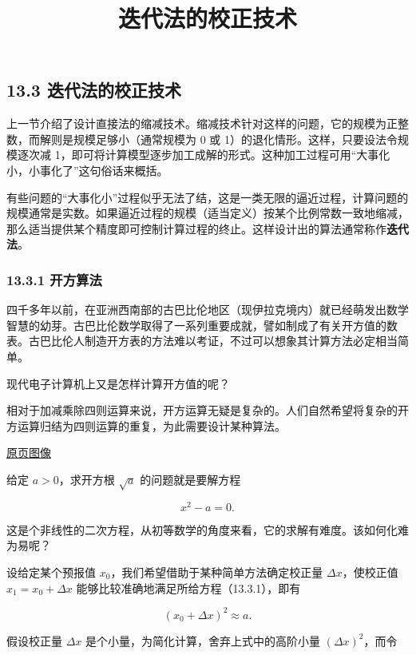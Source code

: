 \documentclass[
  10pt,
  fontset=fandol]{ctexart}
\title{迭代法的校正技术}
\author{}
\date{}
\begin{document}
\maketitle

\subsection{13.3 迭代法的校正技术}\label{ux8fedux4ee3ux6cd5ux7684ux6821ux6b63ux6280ux672f}

上一节介绍了设计直接法的缩减技术。缩减技术针对这样的问题，它的规模为正整数，而解则是规模足够小（通常规模为 0 或 1）的退化情形。这样，只要设法令规模逐次减 1，即可将计算模型逐步加工成解的形式。这种加工过程可用``大事化小，小事化了''这句俗话来概括。

有些问题的``大事化小''过程似乎无法了结，这是一类无限的逼近过程，计算问题的规模通常是实数。如果逼近过程的规模（适当定义）按某个比例常数一致地缩减，那么适当提供某个精度即可控制计算过程的终止。这样设计出的算法通常称作\textbf{迭代法}。

\subsubsection{13.3.1 开方算法}\label{ux5f00ux65b9ux7b97ux6cd5}

四千多年以前，在亚洲西南部的古巴比伦地区（现伊拉克境内）就已经萌发出数学智慧的幼芽。古巴比伦数学取得了一系列重要成就，譬如制成了有关开方值的数表。古巴比伦人制造开方表的方法难以考证，不过可以想象其计算方法必定相当简单。

现代电子计算机上又是怎样计算开方值的呢？

相对于加减乘除四则运算来说，开方运算无疑是复杂的。人们自然希望将复杂的开方运算归结为四则运算的重复，为此需要设计某种算法。

\href{../../source-images/pdf-312.jpeg}{原页图像}

给定 \(a>0\)，求开方根 \(\sqrt{a}\) 的问题就是要解方程

\[
x^2-a=0.
\tag{13.3.1}
\]

这是个非线性的二次方程，从初等数学的角度来看，它的求解有难度。该如何化难为易呢？

设给定某个预报值 \(x_0\)，我们希望借助于某种简单方法确定校正量 \(\Delta x\)，使校正值 \(x_1=x_0+\Delta x\) 能够比较准确地满足所给方程（13.3.1），即有

\[
(x_0+\Delta x)^2\approx a.
\]

假设校正量 \(\Delta x\) 是个小量，为简化计算，舍弃上式中的高阶小量 \((\Delta x)^2\)，而令
\end{document}
